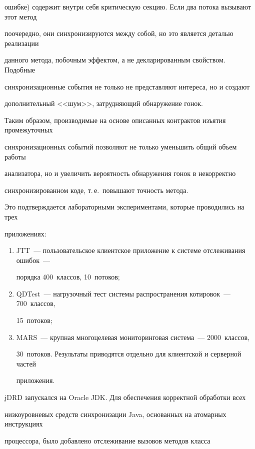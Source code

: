 ошибке) содержит внутри себя критическую секцию. Если два потока вызывают этот метод

поочередно, они синхронизируются между собой, но это является деталью реализации

данного метода, побочным эффектом, а не декларированным свойством. Подобные

синхронизационные события не только не представляют интереса, но и создают

дополнительный <<шум>>, затрудняющий обнаружение гонок.



  Таким образом, производимые на основе описанных контрактов изъятия промежуточных

синхронизационных событий позволяют не только уменьшить общий объем работы

анализатора, но и увеличить вероятность обнаружения гонок в некорректно

синхронизированном коде, т.\,е.\ повышают точность метода.



  Это подтверждается лабораторными экспериментами, которые проводились на трех

приложениях:

  \begin{enumerate}[(1)]

\item JTT~--- пользовательское клиентское приложение к системе отслеживания ошибок~---

порядка 400~классов, 10~потоков;

\item QDTest~--- нагрузочный тест системы распространения котировок~--- 700~классов,

15~потоков;

\item MARS~--- крупная многоцелевая мониторинговая система~--- 2000~классов,

30~потоков. Результаты приводятся отдельно для клиентской и серверной частей

приложения.

\end{enumerate}



  jDRD запускался на Oracle JDK. Для обеспечения корректной обработки всех

низкоуровневых средств синхронизации Java, основанных на атомарных инструкциях

процессора, было добавлено отслеживание вызовов методов класса

